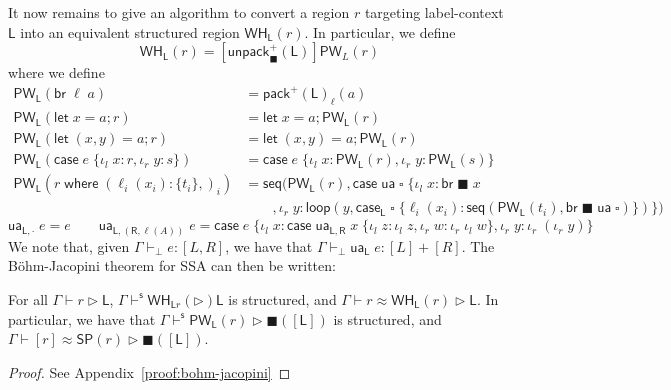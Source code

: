 \documentclass[acmsmall,screen,review]{acmart}
\newcommand{\ms}[1]{\ensuremath{\mathsf{#1}}}
\newcommand{\lto}{:}
\newcommand{\linl}[1]{\iota_l\;{#1}}
\newcommand{\linr}[1]{\iota_r\;{#1}}
\newcommand{\caseexpr}[5]{\ms{case}\;#1\;\{\linl{#2} \lto #3, \linr{#4} \lto #5\}}
\newcommand{\letstmt}[3]{\ensuremath{\ms{let}\;#1 = #2; #3}}
\newcommand{\brb}[2]{\ms{br}\;#1\;#2}
\newcommand{\casestmt}[5]{\ms{case}\;#1\;\{\linl{#2} \lto #3, \linr{#4} \lto #5\}}
\newcommand{\where}[2]{#1\;\ms{where}\;#2}
\newcommand{\wbranch}[3]{#1(#2) \lto \{#3\}}
\newcommand{\hasty}[4]{#1 \vdash_{#2} #3: {#4}}
\newcommand{\haslb}[3]{#1 \vdash #2 \rhd #3}
\newcommand{\shaslb}[3]{#1 \vdash^{\ms{s}} #2 \rhd #3}
\newcommand{\teqv}{\approx}
\newcommand{\lbeq}[4]{#1 \vdash #2 \teqv #3 \rhd {#4}}
\newcommand{\towhile}[2]{\ms{WH}_{#1}(#2)}
\newcommand{\topwhile}[2]{\ms{PW}_{#1}(#2)}
\newcommand{\invar}{\square}
\newcommand{\outlb}{\blacksquare}
\begin{document}
%
It now remains to give an algorithm to convert a region $r$ targeting label-context $\ms{L}$ into an
equivalent structured region $\towhile{\ms{L}}{r}$. In particular, we define
\begin{equation}
  \towhile{\ms{L}}{r} = [\ms{unpack}^+_\outlb(\ms{L})]\topwhile{L}{r}
\end{equation}
where we define
\begin{equation}
  \begin{aligned}
    \topwhile{\ms{L}}{\ms{br}\;\ell\;a} &= \ms{pack}^+(\ms{L})_\ell(a) \\
    \topwhile{\ms{L}}{\letstmt{x}{a}{r}} &= \letstmt{x}{a}{\topwhile{\ms{L}}{r}} \\
    \topwhile{\ms{L}}{\letstmt{(x, y)}{a}{r}} &= \letstmt{(x, y)}{a}{\topwhile{\ms{L}}{r}} \\
    \topwhile{\ms{L}}{\casestmt{e}{x}{r}{y}{s}} 
      &= \casestmt{e}{x}{\topwhile{\ms{L}}{r}}{y}{\topwhile{\ms{L}}{s}} \\
    \topwhile{\ms{L}}{\where{r}{(\wbranch{\ell_i}{x_i}{t_i},)_i}} 
      &=
      \ms{seq}(\topwhile{\ms{L}}{r}, \caseexpr{\ms{ua}\;\invar}{x}{\brb{\outlb}{x}\\ & \qquad}{y}
        {\ms{loop}(y, 
        \ms{case}_{\ms{L}}\;\invar\;
          \{\ell_i(x_i) : \ms{seq}(\topwhile{\ms{L}}{t_i}, \brb{\outlb}{\ms{ua}\;\invar)}\})})
  \end{aligned}
\end{equation}
\begin{equation}
  \ms{ua}_{\ms{L}, \cdot}\;e = e \qquad
  \ms{ua}_{\ms{L}, (\ms{R}, \ell(A))}\;e 
    = \caseexpr{e}{x}{
        \caseexpr{\ms{ua}_{\ms{L}, \ms{R}}\;x}{z}{\iota_l\;z}{w}{\iota_r\;\iota_l\;w}}
        {y}{\iota_r\;(\iota_r\;y)}
\end{equation}
We note that, given $\hasty{\Gamma}{\bot}{e}{[L, R]}$, we have that
$\hasty{\Gamma}{\bot}{\ms{ua}_{\ms{L}}\;e}{[L] + [R]}$. The B\"ohm-Jacopini theorem for SSA can then
be written:
\begin{theorem}[name=B\"ohm-Jacopini for SSA, restate=bohmjacopini]
  For all $\haslb{\Gamma}{r}{\ms{L}}$, $\shaslb{\Gamma}{\towhile{\ms{L}{r}}}{\ms{L}}$ is structured,
  and $\lbeq{\Gamma}{r}{\towhile{\ms{L}}{r}}{\ms{L}}$. In particular, we have that
  $\shaslb{\Gamma}{\topwhile{\ms{L}}{r}}{\outlb([\ms{L}])}$ is structured, and
  $\lbeq{\Gamma}{[r]}{\ms{SP}(r)}{\outlb([\ms{L}])}$.
\end{theorem}
\begin{proof}
  See Appendix~\ref{proof:bohm-jacopini}
\end{proof}
\end{document}
